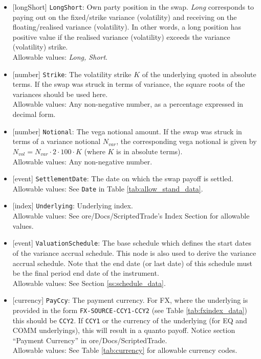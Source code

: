 \begin{itemize}
  \item{}[longShort] \lstinline!LongShort!: Own party position in the swap. \emph{Long} corresponds to paying out on the
  fixed/strike variance (volatility) and receiving on the floating/realised variance (volatility). In other words,
  a long position has positive value if the realised variance (volatility) exceeds the variance (volatility)
  strike. \\
  Allowable values: \emph{Long, Short}.
  \item{}[number] \lstinline!Strike!: The volatility strike $K$ of the underlying quoted in absolute terms.
  If the swap was struck in terms of variance, the square roots of the variances should be used here. \\
  Allowable values: Any non-negative number, as a percentage expressed in decimal form.
  \item{}[number] \lstinline!Notional!: The vega notional amount. If the swap was struck in terms of a variance notional
  $N_{var}$, the corresponding vega notional is given by $N_{vol} = N_{var} \cdot 2 \cdot 100 \cdot K$
  (where $K$ is in absolute terms). \\
  Allowable values: Any non-negative number.
  \item{}[event] \lstinline!SettlementDate!: The date on which the swap payoff is settled. \\
  Allowable values: See \lstinline!Date! in Table \ref{tab:allow_stand_data}.
  \item{}[index] \lstinline!Underlying!: Underlying index. \\
  Allowable values: See ore/Docs/ScriptedTrade's Index Section for allowable values.
  \item{}[event] \lstinline!ValuationSchedule!: The base schedule which defines the start dates of the variance accrual schedule. This node is
  also used to derive the variance accrual schedule. Note that the end date (or last date) of this schedule must be the final
  period end date of the instrument. \\
  Allowable values: See Section \ref{ss:schedule_data}.
  \item{}[currency] \lstinline!PayCcy!: The payment currency. For FX, where the underlying is provided
      in the form \lstinline!FX-SOURCE-CCY1-CCY2! (see Table \ref{tab:fxindex_data}) this should
      be \lstinline!CCY2!. If \lstinline!CCY1! or the currency of the underlying (for EQ and
      COMM underlyings), this will result in a quanto payoff. Notice section ``Payment Currency'' in ore/Docs/ScriptedTrade. \\
        Allowable values: See Table \ref{tab:currency} for allowable currency codes.
\end{itemize}

